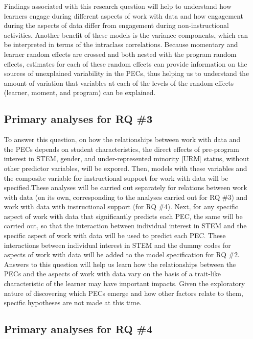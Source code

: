 \documentclass[]{book}
\theoremstyle{definition}
\theoremstyle{definition}
\theoremstyle{definition}
\theoremstyle{remark}
\begin{document}
Findings associated with this research question will help to understand
how learners engage during different aspects of work with data and how
engagement during the aspects of data differ from engagement during
non-instructional activities. Another benefit of these models is the
variance components, which can be interpreted in terms of the intraclass
correlations. Because momentary and learner random effects are crossed
and both nested with the program random effects, estimates for each of
these random effects can provide information on the sources of
unexplained variability in the PECs, thus helping us to understand the
amount of variation that variables at each of the levels of the random
effects (learner, moment, and program) can be explained.

\subsection{Primary analyses for RQ
\#3}\label{primary-analyses-for-rq-3}

To answer this question, on how the relationships between work with data
and the PECs depends on student characteristics, the direct effects of
pre-program interest in STEM, gender, and under-represented minority
{[}URM{]} status, without other predictor variables, will be expored.
Then, models with these variables and the composite variable for
instructional support for work with data will be specified.These
analyses will be carried out separately for relations between work with
data (on its own, corresponding to the analyses carried out for RQ \#3)
and work with data with instructional support (for RQ \#4). Next, for
any specific aspect of work with data that significantly predicts each
PEC, the same will be carried out, so that the interaction between
individual interest in STEM and the specific aspect of work with data
will be used to predict each PEC. These interactions between individual
interest in STEM and the dummy codes for aspects of work with data will
be added to the model specification for RQ \#2. Answers to this question
will help us learn how the relationships between the PECs and the
aspects of work with data vary on the basis of a trait-like
characteristic of the learner may have important impacts. Given the
exploratory nature of discovering which PECs emerge and how other
factors relate to them, specific hypotheses are not made at this time.

\subsection{Primary analyses for RQ
\#4}\label{primary-analyses-for-rq-4}
\end{document}
